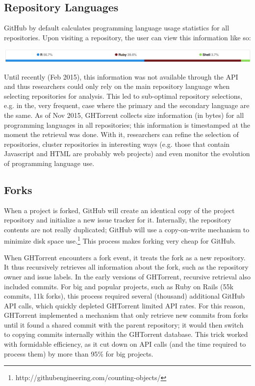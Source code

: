 \documentclass{sig-alternate}
\begin{document}
\subsection{Repository Languages}
GitHub by default calculates programming language usage statistics for all
repositories. Upon visiting a repository, the user can view this information
like so:

\noindent\includegraphics[scale=0.243]{languages}

Until recently (Feb 2015), this information was not available through the API
and thus researchers could only rely on the main repository language when
selecting repositories for analysis. This led to sub-optimal repository
selections, e.g. in the, very frequent, case where the primary and the secondary
language are the same. As of Nov 2015, GHTorrent collects size information (in
bytes) for all programming languages in all repositories; this information is
timestamped at the moment the retrieval was done. With it, researchers can
refine the selection of repositories, cluster repositories in interesting ways
(e.g. those that contain Javascript and HTML are probably web projects) and even
monitor the evolution of programming language use.

\subsection{Forks}

When a project is forked, GitHub will create an identical copy of the project
repository and initialize a new issue tracker for it. Internally, the repository
contents are not really duplicated; GitHub will use a copy-on-write
mechanism to minimize disk space use.\footnote{http://githubengineering.com/counting-objects/} This process makes forking very cheap for GitHub.

When GHTorrent encounters a fork event, it treats the fork as a new repository.
It thus recursively retrieves all information about the fork, such as the
repository owner and issue labels. In the early versions of
GHTorrent, recursive retrieval also included commits. For big and popular
projects, such as Ruby on Rails (55k commits, 11k forks),
this process required several (thousand) additional GitHub API calls, which
quickly depleted GHTorrent limited API rates. For this reason, GHTorrent implemented a mechanism that only retrieve new commits from forks until
it found a shared commit with the parent repository; it would then switch
to copying commits internally within the GHTorrent database. This trick worked
with formidable efficiency, as it cut down on API calls (and the time required
to process them) by more than 95\% for big projects.
\end{document}
